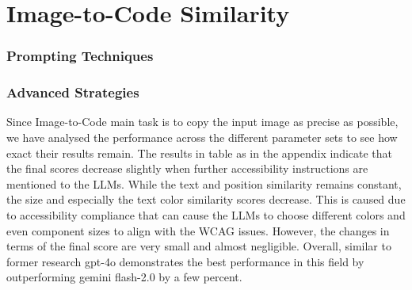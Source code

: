 \section{Image-to-Code Similarity}
\subsubsection{Prompting Techniques}
\subsubsection{Advanced Strategies}
Since Image-to-Code main task is to copy the input image as precise as possible,
we have analysed the performance across the different parameter sets to see how 
exact their results remain. The results in table as in the appendix 
indicate that the final scores decrease slightly when further accessibility 
instructions are mentioned to the LLMs. While the text and position similarity 
remains constant, the size and especially the text color similarity scores 
decrease. This is caused due to accessibility compliance that can cause the
LLMs to choose different colors and even component sizes to align with the 
WCAG issues. However, the changes in terms of the final score are very small 
and almost negligible.\newline
Overall, similar to former research gpt-4o demonstrates the best performance 
in this field by outperforming gemini flash-2.0 by a few percent.




